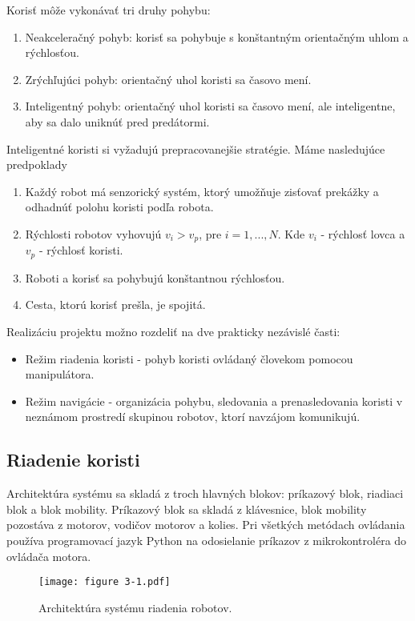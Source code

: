 \justifying
\noindent
Korisť môže vykonávať tri druhy pohybu:
\begin{enumerate}
\item Neakceleračný pohyb: korisť sa pohybuje s konštantným orientačným uhlom a rýchlosťou.
\item Zrýchľujúci pohyb: orientačný uhol koristi sa časovo mení.
\item Inteligentný pohyb: orientačný uhol koristi sa časovo mení, ale inteligentne, aby sa dalo uniknúť pred predátormi.
\end{enumerate}
Inteligentné koristi si vyžadujú prepracovanejšie stratégie. Máme nasledujúce predpoklady
\begin{enumerate}
\item Každý robot má senzorický systém, ktorý umožňuje zisťovať prekážky a odhadnúť polohu koristi podľa robota.
\item Rýchlosti robotov vyhovujú 
$v_i > v_p$, pre $i = 1, ..., N$. Kde $v_i$ - rýchlosť lovca a $v_p$ - rýchlosť koristi.
\item Roboti a korisť sa pohybujú konštantnou rýchlosťou.
\item Cesta, ktorú korisť prešla, je spojitá.
\end{enumerate}

\noindent
Realizáciu projektu možno rozdeliť na dve prakticky nezávislé časti:
\begin{itemize}
\item Režim riadenia koristi - pohyb koristi ovládaný človekom pomocou manipulátora.
\item Režim navigácie - organizácia pohybu, sledovania a prenasledovania koristi v neznámom prostredí skupinou robotov,
ktorí navzájom
komunikujú.
\end{itemize}

\subsection{Riadenie koristi}
Architektúra systému sa skladá z troch hlavných blokov:
príkazový blok, riadiaci blok a blok mobility. Príkazový blok sa skladá z klávesnice, blok mobility pozostáva z motorov,
vodičov motorov a kolies. Pri všetkých metódach ovládania používa programovací jazyk Python na odosielanie príkazov z
mikrokontroléra do ovládača motora.

\begin{figure}[ht!]
\centering
\texttt{[image: figure 3-1.pdf]}
\caption{Architektúra systému riadenia robotov.}
\label{o:31}
\end{figure}

